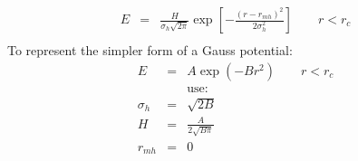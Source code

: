 \documentclass[12pt]{article}
\begin{document}
\begin{eqnarray*}
 E & = & \frac{H}{\sigma_h\sqrt{2\pi}} \exp\left[-\frac{(r-r_{mh})^2}{2\sigma_h^2}\right] \qquad r < r_c \\
\end{eqnarray*}
To represent the simpler form of a Gauss potential:
\begin{eqnarray*}
 E & = & A \exp(-B r^2) \qquad r < r_c \\
 & &\mbox{use:} \\
 \sigma_h & = & \sqrt{2 B} \\
 H & = & \frac{A}{2\sqrt{B\pi}}\\
 r_{mh} & = & 0
\end{eqnarray*}
\end{document}
